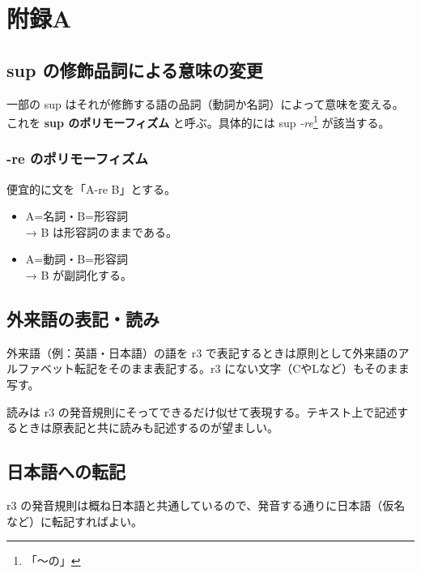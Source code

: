 \section{附録A}

\subsection{sup の修飾品詞による意味の変更}

一部の sup はそれが修飾する語の品詞（動詞か名詞）によって意味を変える。これを \textbf{sup のポリモーフィズム} と呼ぶ。具体的には sup \emph{-re}\footnote{「～の」} が該当する。

\subsubsection{-re のポリモーフィズム}

便宜的に文を「A-re B」とする。

\begin{itemize}
    \item A=名詞・B=形容詞 \\ → B は形容詞のままである。
    \item A=動詞・B=形容詞 \\ → B が副詞化する。
\end{itemize}

\subsection{外来語の表記・読み}

外来語（例：英語・日本語）の語を r3 で表記するときは原則として外来語のアルファベット転記をそのまま表記する。r3 にない文字（CやLなど）もそのまま写す。

読みは r3 の発音規則にそってできるだけ似せて表現する。テキスト上で記述するときは原表記と共に読みも記述するのが望ましい。

\subsection{日本語への転記}

r3 の発音規則は概ね日本語と共通しているので、発音する通りに日本語（仮名など）に転記すればよい。